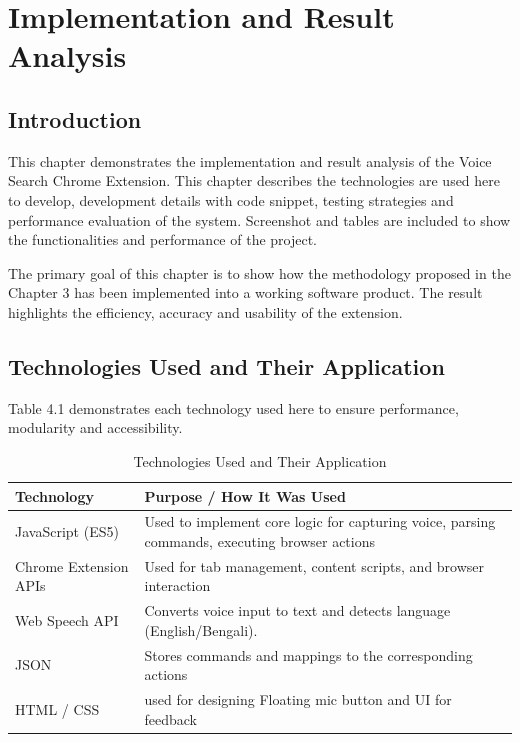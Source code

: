 \chapter{Implementation and Result Analysis}

\section{Introduction}
This chapter demonstrates the implementation and result analysis of the Voice Search Chrome Extension. This chapter describes the  technologies are used here to develop, development details with code snippet, testing strategies and performance evaluation of the system. Screenshot and tables are included to show the functionalities and performance of the project.

The primary goal of this chapter is to show how the methodology proposed in the Chapter 3 has been implemented into a working software product. The result highlights the efficiency, accuracy and usability of the extension.



\section{Technologies Used and Their Application}
Table 4.1 demonstrates each technology used here to ensure performance, modularity and accessibility.
\begin{table}[H]
\centering
\caption{Technologies Used and Their Application}
\label{tab:technologies_used}
\begin{tabular}{|p{4cm}|p{10cm}|}
\hline
\textbf{Technology} & \textbf{Purpose / How It Was Used} \\ \hline
JavaScript (ES5) & Used to implement core logic for capturing voice, parsing commands, executing browser actions \\ \hline
Chrome Extension APIs & Used for tab management, content scripts, and browser interaction \\ \hline
Web Speech API & Converts voice input to text and detects language (English/Bengali). \\ \hline
JSON & Stores commands and mappings to the corresponding actions \\ \hline
HTML / CSS & used for designing Floating mic button and UI for feedback \\ \hline

\end{tabular}
\end{table}


